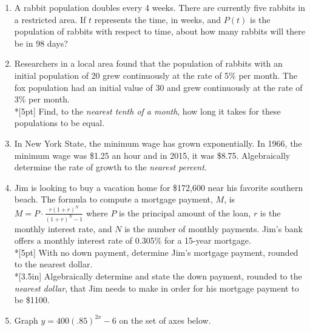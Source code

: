 \documentclass[12pt, oneside]{article}
\begin{document}
\begin{enumerate}
\item A rabbit population doubles every 4 weeks. There are currently five rabbits in a restricted area. If $t$ represents the time, in weeks, and $P(t)$ is the population of rabbits with respect to time, about how many rabbits will there be in 98 days? %

\newpage

\item Researchers in a local area found that the population of rabbits with an initial population of 20 grew continuously at the rate of 5\% per month. The fox population had an initial value of 30 and grew continuously at the rate of 3\% per month.\\*[5pt]
Find, to the \emph{nearest tenth of a month}, how long it takes for these populations to be equal.\\[3in] %

\item In New York State, the minimum wage has grown exponentially. In 1966, the minimum wage was \$1.25 an hour and in 2015, it was \$8.75. Algebraically determine the rate of growth to the \emph{nearest percent}.

\newpage
\item Jim is looking to buy a vacation home for \$172,600 near his favorite southern beach. The formula to compute a mortgage payment, $M$, is $\displaystyle M=P \cdot \frac{r(1+r)^N}{(1+r)^N-1}$ where $P$ is the principal amount of the loan, $r$ is the monthly interest rate, and $N$ is the number of monthly payments. Jim’s bank offers a monthly interest rate of 0.305\% for a 15-year mortgage.\\*[5pt]
With no down payment, determine Jim’s mortgage payment, rounded to the nearest dollar.\\*[3.5in]
Algebraically determine and state the down payment, rounded to the \emph{nearest dollar}, that Jim needs to make in order for his mortgage payment to be \$1100.

\newpage

\item Graph $y=400(.85)^{2x}-6$ on the set of axes below.
\begin{center}
\end{center} %


\end{enumerate}
\end{document}
